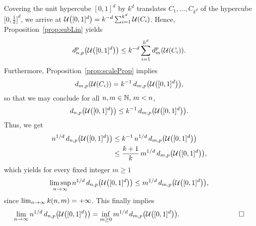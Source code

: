 Covering the unit hypercube $[0,1]^d$ by $k^d$ translates $C_1, \ldots,
C_{k^d}$ of the hypercube $\bigl[0,\frac{1}{k}\bigr]^d$,
we arrive at $\mathcal{U}\bigl([0,1]^d\bigr) = k^{-d} \sum_{i=1}^{k^d} \mathcal{U}(C_i)$. Hence, Proposition~\ref{prop:subLin} yields
\[
d_{n,p}^p\bigl(\mathcal{U}\bigl([0,1]^d\bigr) \bigr) \leq k^{-d}\sum_{i=1}^{k^d} d^p_m(\mathcal{U}(C_i)).
\]
%
Furthermore, Proposition~\ref{prop:scaleProp} implies
\[
d_{m,p}(\mathcal{U}(C_i)) = k^{-1}\, d_{m,p}\bigl(\mathcal{U}\bigl([0,1]^d\bigr) \bigr),
\]
so that we may conclude for all $n,m\in\mathbb{N},\, m<n$,
\[
	d_{n,p}\bigl(\mathcal{U}\bigl([0,1]^d\bigr) \bigr) \leq k^{-1}\, d_{m,p}\bigl(\mathcal{U}\bigl([0,1]^d\bigr) \bigr).
\]
Thus, we get 
\begin{eqnarray*}
\begin{split}
  n^{1/d}\,d_{n,p}\bigl(\mathcal{U}\bigl([0,1]^d\bigr) \bigr) & \leq k^{-1}\, n^{1/d}\,d_{m,p}\bigl(\mathcal{U}\bigl([0,1]^d\bigr)
  \bigr)\\
  	& \leq  \frac{k+1}{k} \, m^{1/d}\, d_{m,p}\bigl(\mathcal{U}\bigl([0,1]^d\bigr)
  \bigr), 
\end{split}
\end{eqnarray*}
which yields for every fixed integer $m \geq 1$%
\[
	\limsup_{n\to\infty} n^{1/d}\, d_{n,p}\bigl(\mathcal{U}\bigl([0,1]^d\bigr) \bigr) \leq m^{1/d}\, d_{m,p}\bigl(\mathcal{U}\bigl([0,1]^d\bigr)
	\bigr),
\]
since $\lim_{n\to\infty} k(n,m) = +\infty$. This finally implies
\[
\limn n^{1/d}\,d_{n,p}\bigl(\Unifd \bigr)  = \inf_{m\geq 0} m^{1/d}\,
d_{m,p}\bigl(\Unifd \bigr).\hskip 3 cm  \Box
\]

